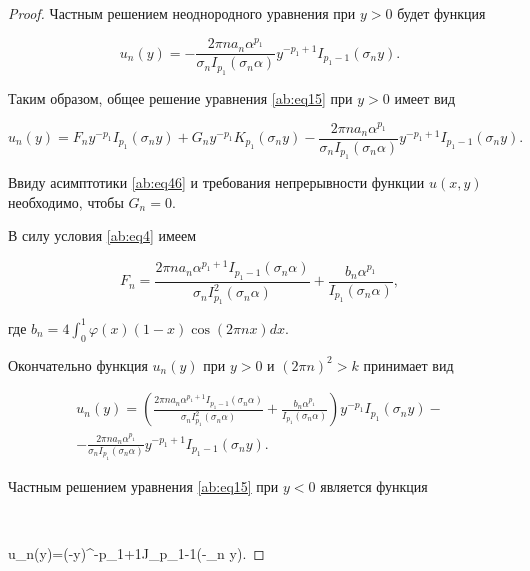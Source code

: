 \begin{proof}
Частным решением неоднородного уравнения при $y>0$ будет функция

$$

u_n(y)=-\frac{2\pi na_n\alpha^{p_1}}{\sigma_nI_{p_1}(\sigma_n\alpha)}y^{-p_1+1}I_{p_1-1}(\sigma_n y).

$$



Таким образом, общее решение уравнения \eqref{ab:eq15} при $y>0$ имеет вид

\begin{equation}\label{ab:eq17}

u_n(y)=F_ny^{-p_1}I_{p_1}(\sigma_n y)+G_ny^{-p_1}K_{p_1}(\sigma_n y)-\frac{2\pi na_n\alpha^{p_1}}{\sigma_nI_{p_1}(\sigma_n\alpha)}y^{-p_1+1}I_{p_1-1}(\sigma_n y).

\end{equation}



Ввиду асимптотики \eqref{ab:eq46} и требования непрерывности функции $u(x,y)$ необходимо, чтобы  $G_n=0$.



В силу условия \eqref{ab:eq4} имеем 

$$F_n=\frac{2\pi na_n\alpha^{p_1+1}I_{p_1-1}(\sigma_n\alpha)}{\sigma_nI_{p_1}^2(\sigma_n\alpha)}+\frac{b_n\alpha^{p_1}}{I_{p_1}(\sigma_n\alpha)},$$ 

где $b_n=4 \displaystyle \int _0^1\varphi(x)(1-x)\cos (2\pi nx)dx$.







Окончательно функция $u_n(y)$ при $y>0$ и $(2\pi n)^2>k$ принимает вид

 \begin{multline}\label{ab:eq18}

u_n(y)=\left(\frac{2\pi na_n\alpha^{p_1+1}I_{p_1-1}(\sigma_n\alpha)}{\sigma_nI_{p_1}^2(\sigma_n\alpha)}+\frac{b_n\alpha^{p_1}}{I_{p_1}(\sigma_n\alpha)}\right)y^{-p_1}I_{p_1}(\sigma_ny)-\\

-\frac{2\pi na_n\alpha^{p_1}}{\sigma_nI_{p_1}(\sigma_n\alpha)}y^{-p_1+1}I_{p_1-1}(\sigma_n y).

\end{multline} 



Частным решением уравнения \eqref{ab:eq15} при $y<0$ является функция

$$

u_n(y)=(-y)^{-p_1+1}J_{p_1-1}(-\sigma_n y).


\end{proof}
